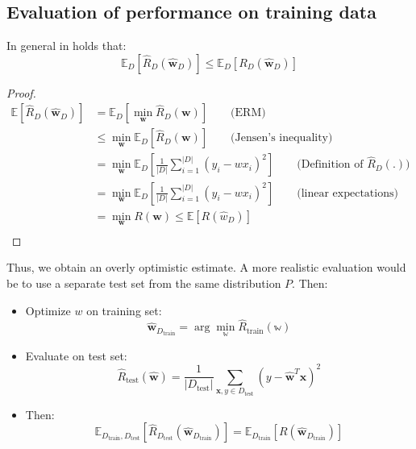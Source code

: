 \documentclass[a4paper,10pt,twoside]{article}
\begin{document}
\subsection{Evaluation of performance on training data}

In general in holds that:
\begin{equation*}
    \mathbb{E}_D[\hat{R}_D(\hat{\mathbf{w}}_D)]\leq\mathbb{E}_D[R_D(\hat{\mathbf{w}}_D)]
\end{equation*}
\begin{proof}[Proof]
    \begin{align*}
        \mathbb{E}[\hat{R}_D(\hat{\mathbf{w}}_D)] &= \mathbb{E}_D[\min_{\mathbf{w}}\hat{R}_D(\mathbf{w})]\qquad\text{(ERM)}\\
        &\leq \min_{\mathbf{w}}\mathbb{E}_D[\hat{R}_D(\mathbf{w})]\qquad\text{(Jensen's inequality)}\\
        &= \min_{\mathbf{w}}\mathbb{E}_D[\frac{1}{|D|}\sum_{i=1}^{|D|}(y_i-wx_i)^2]\qquad\text{(Definition of $\hat{R}_D(.)$)}\\
        &= \min_{\mathbf{w}}\mathbb{E}_D[\frac{1}{|D|}\sum_{i=1}^{|D|}(y_i-wx_i)^2]\qquad\text{(linear expectations)}\\
        &= \min_{\mathbf{w}}R(\mathbf{w})\leq\mathbb{E}[R(\hat{w}_D)]\\
    \end{align*}
\end{proof}
Thus, we obtain an overly optimistic estimate. A more realistic evaluation would be to use a separate test set from the same distribution $P$. Then:
\begin{itemize}
    \item Optimize $w$ on training set:
    \begin{equation*}
        \mathbf{\hat{w}}_{D_{\text{train}}} = \arg\min_{\mathbb{w}} \hat{R}_{\text{train}}(\mathbb{w})
    \end{equation*}
    \item Evaluate on test set:
    \begin{equation*}
        \hat{R}_{\text{test}}(\mathbf{\hat{w}})=\frac{1}{|D_{\text{test}}|}\sum_{\mathbf{x},y\in D_{\text{test}}}^{}(y-\hat{\mathbf{w}}^T\mathbf{x})^2
    \end{equation*}
    \item Then:
    \begin{equation*}
        \mathbb{E}_{D_{\text{train}}, D_{\text{test}}}[\hat{R}_{D_{\text{test}}}(\hat{\mathbf{w}}_{D_{\text{train}}})]=\mathbb{E}_{D_{\text{train}}}[R(\mathbf{\hat{w}}_{D_{\text{train}}})]
    \end{equation*}
\end{itemize}
\end{document}
